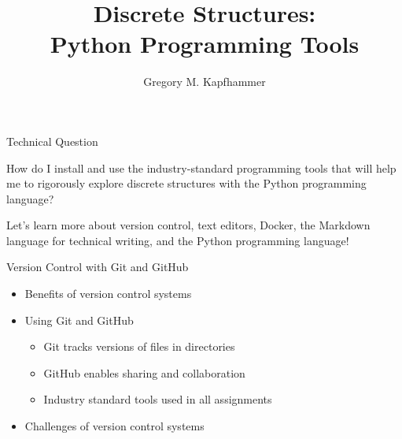 \documentclass[14pt,aspectratio=169]{beamer}
\title{Discrete Structures: \\ Python Programming Tools}
\author{Gregory M. Kapfhammer}
\institute[shortinst]{Department of Computer Science, Allegheny College}
\begin{document}
{
  \begin{frame}
    \titlepage
  \end{frame}
}


\begin{frame}{Technical Question}

  \begin{center}
    {\large How do I install and use the industry-standard programming tools that will
    help me to rigorously explore discrete structures with the Python
  programming language?}
  \end{center}

  \vspace{2ex}

  \begin{center}
    \small Let's learn more about version control, text editors, Docker,
    the Markdown language for technical writing, and the Python programming
    language!
  \end{center}

\end{frame}


\begin{frame}{Version Control with Git and GitHub}

  \begin{itemize}
    \item Benefits of version control systems
    \item Using Git and GitHub
      \begin{itemize}
        \item Git tracks versions of files in directories
        \item GitHub enables sharing and collaboration
        \item Industry standard tools used in all assignments
      \end{itemize}
    \item Challenges of version control systems
  \end{itemize}


\end{frame}
\end{document}
